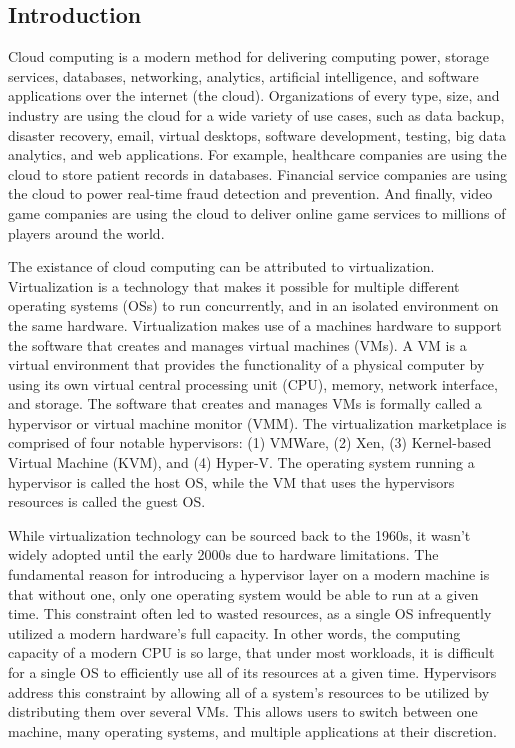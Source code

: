 \documentclass{report}
\begin{document}
\begin{spacing}{1.5}


\newpage
\chapter{Introduction}


{\large
Cloud computing is a modern method for delivering computing power, storage services, databases, networking, analytics, artificial intelligence, and software applications over the internet (the cloud). Organizations of every type, size, and industry are using the cloud for a wide variety of use cases, such as data backup, disaster recovery, email, virtual desktops, software development, testing, big data analytics, and web applications. For example, healthcare companies are using the cloud to store patient records in databases. Financial service companies are using the cloud to power real-time fraud detection and prevention. And finally, video game companies are using the cloud to deliver online game services to millions of players around the world.
\newline
}

{\large
The existance of cloud computing can be attributed to virtualization. Virtualization is a technology that makes it possible for multiple different operating systems (OSs) to run concurrently, and in an isolated environment on the same hardware. Virtualization makes use of a machines hardware to support the software that creates and manages virtual machines (VMs). A VM is a virtual environment that provides the functionality of a physical computer by using its own virtual central processing unit (CPU), memory, network interface, and storage. The software that creates and manages VMs is formally called a hypervisor or virtual machine monitor (VMM). The virtualization marketplace is comprised of four notable hypervisors: (1) VMWare, (2) Xen, (3) Kernel-based Virtual Machine (KVM), and (4) Hyper-V. The operating system running a hypervisor is called the host OS, while the VM that uses the hypervisors resources is called the guest OS.
\newline
}

{\large
While virtualization technology can be sourced back to the 1960s, it wasn’t widely adopted until the early 2000s due to hardware limitations. The fundamental reason for introducing a hypervisor layer on a modern machine is that without one, only one operating system would be able to run at a given time. This constraint often led to wasted resources, as a single OS infrequently utilized a modern hardware’s full capacity. In other words, the computing capacity of a modern CPU is so large, that under most workloads, it is difficult for a single OS to efficiently use all of its resources at a given time. Hypervisors address this constraint by allowing all of a system’s resources to be utilized by distributing them over several VMs. This allows users to switch between one machine, many operating systems, and multiple applications at their discretion.
\newline
}


\end{spacing}
\end{document}
